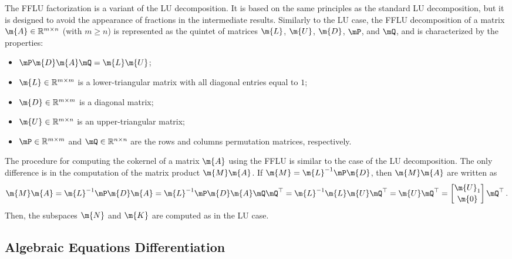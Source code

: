 The \ac{FFLU} factorization is a variant of the \ac{LU} decomposition. It is based on the same principles as the standard \ac{LU} decomposition, but it is designed to avoid the appearance of fractions in the intermediate results. Similarly to the \ac{LU} case, the \ac{FFLU} decomposition of a matrix $\m{A} \in \mathbb{R}^{m \times n}$ (with $m\geq n$) is represented as the quintet of matrices $\m{L}$, $\m{U}$, $\m{D}$, $\mP$, and $\mQ$, and is characterized by the properties:
%
\begin{itemize}
  \setlength{\itemsep}{0.0em}
  \item $\mP\m{D}\m{A}\mQ = \m{L}\m{U}$;
  \item $\m{L} \in \mathbb{R}^{m \times m}$ is a lower-triangular matrix with all diagonal entries equal to $1$;
  \item $\m{D} \in \mathbb{R}^{m \times m}$ is a diagonal matrix;
  \item $\m{U} \in \mathbb{R}^{m \times n}$ is an upper-triangular matrix;
  \item $\mP \in \mathbb{R}^{m \times m}$ and $\mQ \in \mathbb{R}^{n \times n}$ are the rows and columns permutation matrices, respectively.
\end{itemize}
%
The procedure for computing the cokernel of a matrix $\m{A}$ using the \ac{FFLU} is similar to the case of the \ac{LU} decomposition. The only difference is in the computation of the matrix product $\m{M}\m{A}$. If $\m{M} = \m{L}^{-1}\mP\m{D}$, then $\m{M}\m{A}$ are written as
%
\begin{equation*}
  \m{M}\m{A}
  = \m{L}^{-1}\mP\m{D}\m{A}
  = \m{L}^{-1}\mP\m{D}\m{A}\mQ\mQ^\top
  = \m{L}^{-1}\m{L}\m{U}\mQ^\top
  = \m{U}\mQ^\top = \begin{bmatrix} \m{U}_1 \\[0.2em] \m{0} \end{bmatrix}\mQ^\top \, \text{.}
\end{equation*}
%
Then, the subspaces $\m{N}$ and $\m{K}$ are computed as in the \ac{LU} case.

\subsection{Algebraic Equations Differentiation}
\label{chap4:sec:differentiation}

